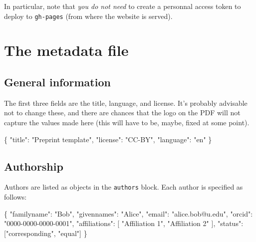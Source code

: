 \documentclass[10pt,oneside]{article}
\newenvironment{Shaded}{\begin{snugshade}}{\end{snugshade}}
\newcommand{\DataTypeTok}[1]{\textcolor[rgb]{0.13,0.29,0.53}{#1}}
\newcommand{\StringTok}[1]{\textcolor[rgb]{0.31,0.60,0.02}{#1}}
\newcommand{\OtherTok}[1]{\textcolor[rgb]{0.56,0.35,0.01}{#1}}
\newcommand{\FunctionTok}[1]{\textcolor[rgb]{0.00,0.00,0.00}{#1}}
\begin{document}
In particular, note that \emph{you do not need} to create a personnal
access token to deploy to \texttt{gh-pages} (from where the website is
served).

\hypertarget{the-metadata-file}{%
\section{The metadata file}\label{the-metadata-file}}

\hypertarget{general-information}{%
\subsection{General information}\label{general-information}}

The first three fields are the title, language, and license. It's
probably advisable not to change these, and there are chances that the
logo on the PDF will not capture the values made here (this will have to
be, maybe, fixed at some point).

\begin{Shaded}
\begin{Highlighting}[]
\FunctionTok{\{}
    \DataTypeTok{"title"}\FunctionTok{:} \StringTok{"Preprint template"}\FunctionTok{,}
    \DataTypeTok{"license"}\FunctionTok{:} \StringTok{"CC{-}BY"}\FunctionTok{,}
    \DataTypeTok{"language"}\FunctionTok{:} \StringTok{"en"}
\FunctionTok{\}}
\end{Highlighting}
\end{Shaded}

\hypertarget{authorship}{%
\subsection{Authorship}\label{authorship}}

Authors are listed as objects in the \texttt{authors} block. Each author
is specified as follows:

\begin{Shaded}
\begin{Highlighting}[]
\FunctionTok{\{}
      \DataTypeTok{"familyname"}\FunctionTok{:} \StringTok{"Bob"}\FunctionTok{,}
      \DataTypeTok{"givennames"}\FunctionTok{:} \StringTok{"Alice"}\FunctionTok{,}
      \DataTypeTok{"email"}\FunctionTok{:} \StringTok{"alice.bob@u.edu"}\FunctionTok{,}
      \DataTypeTok{"orcid"}\FunctionTok{:} \StringTok{"0000{-}0000{-}0000{-}0001"}\FunctionTok{,}
      \DataTypeTok{"affiliations"}\FunctionTok{:} \OtherTok{[}
        \StringTok{"Affiliation 1"}\OtherTok{,}
        \StringTok{"Affiliation 2"}
      \OtherTok{]}\FunctionTok{,}
      \DataTypeTok{"status"}\FunctionTok{:} \OtherTok{[}\StringTok{"corresponding"}\OtherTok{,} \StringTok{"equal"}\OtherTok{]}
    \FunctionTok{\}}
\end{Highlighting}
\end{Shaded}
\end{document}
